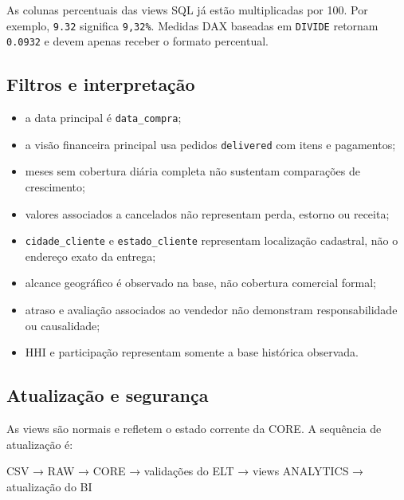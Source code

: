 \documentclass[12pt,a4paper]{article}
\providecommand{\tightlist}{
  \setlength{\itemsep}{0pt}\setlength{\parskip}{0pt}
}
\newenvironment{Shaded}{}{}
\newcommand{\NormalTok}[1]{#1}
\begin{document}
As colunas percentuais das views SQL já estão multiplicadas por 100. Por
exemplo, \nolinkurl{9.32} significa \nolinkurl{9,32%}. Medidas DAX
baseadas em \nolinkurl{DIVIDE} retornam \nolinkurl{0.0932} e devem
apenas receber o formato percentual.

\subsection{Filtros e
interpretação}\label{docs__analytics__consumo_power_bi_sql.md__filtros-e-interpretauxe7uxe3o}

\begin{itemize}
\tightlist
\item
  a data principal é \nolinkurl{data_compra};
\item
  a visão financeira principal usa pedidos \nolinkurl{delivered} com
  itens e pagamentos;
\item
  meses sem cobertura diária completa não sustentam comparações de
  crescimento;
\item
  valores associados a cancelados não representam perda, estorno ou
  receita;
\item
  \nolinkurl{cidade_cliente} e \nolinkurl{estado_cliente} representam
  localização cadastral, não o endereço exato da entrega;
\item
  alcance geográfico é observado na base, não cobertura comercial
  formal;
\item
  atraso e avaliação associados ao vendedor não demonstram
  responsabilidade ou causalidade;
\item
  HHI e participação representam somente a base histórica observada.
\end{itemize}

\subsection{Atualização e
segurança}\label{docs__analytics__consumo_power_bi_sql.md__atualizauxe7uxe3o-e-seguranuxe7a}

As views são normais e refletem o estado corrente da CORE. A sequência
de atualização é:

\begin{Shaded}
\begin{Highlighting}[]
\NormalTok{CSV → RAW → CORE → validações do ELT → views ANALYTICS → atualização do BI}
\end{Highlighting}
\end{Shaded}
\end{document}
